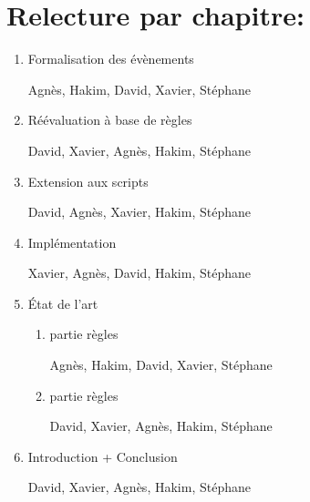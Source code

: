\documentclass[11pt]{article}
\begin{document}
\section{Relecture par chapitre:}
\label{sec:org8243ae0}
\begin{enumerate}
\item Formalisation des évènements
\label{sec:org7c81031}

Agnès, Hakim, David, Xavier, Stéphane
\item Réévaluation à base de règles
\label{sec:orga9a373c}

David, Xavier, Agnès, Hakim, Stéphane
\item Extension aux scripts
\label{sec:orgd4544de}

David, Agnès, Xavier, Hakim, Stéphane
\item Implémentation
\label{sec:org54466ef}

Xavier, Agnès, David, Hakim, Stéphane
\item État de l'art
\label{sec:org507c6a9}
\begin{enumerate}
\item partie règles
\label{sec:orgf077136}

Agnès, Hakim, David, Xavier, Stéphane
\item partie règles
\label{sec:org90b29ee}

David, Xavier, Agnès, Hakim, Stéphane
\end{enumerate}
\item Introduction + Conclusion
\label{sec:org9815f32}

David, Xavier, Agnès, Hakim, Stéphane
\end{enumerate}
\end{document}
